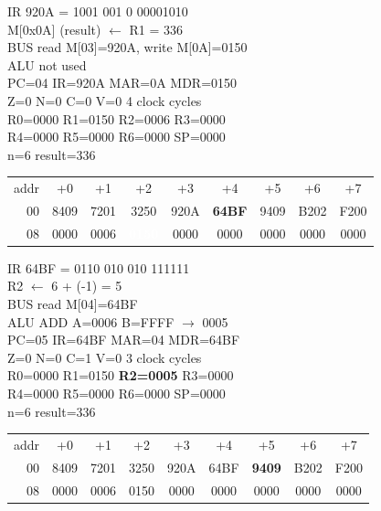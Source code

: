 \noindent\begin{tcolorbox}[stepbox, title={Step 14 \hfill PC 03 \quad ST R1, result}]
\textcolor{dim}{IR} 920A = 1001 001 0 00001010\\
M[0x0A] (result) $\leftarrow$ R1 = 336\\
\textcolor{dim}{BUS} read M[03]=920A, \textcolor{wrt}{write M[0A]=0150}\\
\textcolor{dim}{ALU} \textcolor{dim}{not used}\\
PC=04 IR=920A MAR=0A MDR=0150\\
Z=0 N=0 C=0 V=0 \hfill \textcolor{dim}{4 clock cycles}\\
R0=0000 R1=0150 R2=0006 R3=0000\\
R4=0000 R5=0000 R6=0000 SP=0000\\
\textcolor{dim}{n=6  result=336}\\[1pt]
{\setlength{\tabcolsep}{1.6pt}\begin{tabular}{@{}r*{8}{c}@{}}
\textcolor{dim}{addr} & \textcolor{dim}{+0} & \textcolor{dim}{+1} & \textcolor{dim}{+2} & \textcolor{dim}{+3} & \textcolor{dim}{+4} & \textcolor{dim}{+5} & \textcolor{dim}{+6} & \textcolor{dim}{+7}\\
\textcolor{dim}{00} & 8409 & 7201 & 3250 & 920A & \cellcolor{pcc}\textbf{64BF} & 9409 & B202 & F200\\
\textcolor{dim}{08} & 0000 & \cellcolor{datac}0006 & \cellcolor{wrt}\textcolor{white}{\textbf{0150}} & 0000 & 0000 & 0000 & 0000 & 0000\\
\end{tabular}}
\end{tcolorbox}\hfill\begin{tcolorbox}[stepbox, title={Step 15 \hfill PC 04 \quad ADDI R2, R2, -1}]
\textcolor{dim}{IR} 64BF = 0110 010 010 111111\\
R2 $\leftarrow$ 6 + (-1) = 5\\
\textcolor{dim}{BUS} read M[04]=64BF\\
\textcolor{dim}{ALU} ADD A=0006 B=FFFF $\rightarrow$ 0005\\
PC=05 IR=64BF MAR=04 MDR=64BF\\
Z=0 N=0 C=1 V=0 \hfill \textcolor{dim}{3 clock cycles}\\
R0=0000 R1=0150 \textcolor{wrt}{\textbf{R2=0005}} R3=0000\\
R4=0000 R5=0000 R6=0000 SP=0000\\
\textcolor{dim}{n=6  result=336}\\[1pt]
{\setlength{\tabcolsep}{1.6pt}\begin{tabular}{@{}r*{8}{c}@{}}
\textcolor{dim}{addr} & \textcolor{dim}{+0} & \textcolor{dim}{+1} & \textcolor{dim}{+2} & \textcolor{dim}{+3} & \textcolor{dim}{+4} & \textcolor{dim}{+5} & \textcolor{dim}{+6} & \textcolor{dim}{+7}\\
\textcolor{dim}{00} & 8409 & 7201 & 3250 & 920A & 64BF & \cellcolor{pcc}\textbf{9409} & B202 & F200\\
\textcolor{dim}{08} & 0000 & \cellcolor{datac}0006 & \cellcolor{datac}0150 & 0000 & 0000 & 0000 & 0000 & 0000\\
\end{tabular}}
\end{tcolorbox}\par\vspace{3pt}
